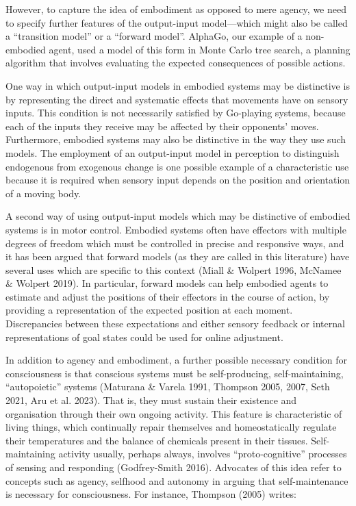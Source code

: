 \documentclass[12pt]{article}
\begin{document}
However, to capture the idea of embodiment as opposed to mere agency, we need to specify further features of the output-input model—which might also be called a ``transition model'' or a ``forward model''. AlphaGo, our example of a non-embodied agent, used a model of this form in Monte Carlo tree search, a planning algorithm that involves evaluating the expected consequences of possible actions.

One way in which output-input models in embodied systems may be distinctive is by representing the direct and systematic effects that movements have on sensory inputs. This condition is not necessarily satisfied by Go-playing systems, because each of the inputs they receive may be affected by their opponents’ moves. Furthermore, embodied systems may also be distinctive in the way they use such models. The employment of an output-input model in perception to distinguish endogenous from exogenous change is one possible example of a characteristic use because it is required when sensory input depends on the position and orientation of a moving body.

A second way of using output-input models which may be distinctive of embodied systems is in motor control. Embodied systems often have effectors with multiple degrees of freedom which must be controlled in precise and responsive ways, and it has been argued that forward models (as they are called in this literature) have several uses which are specific to this context (Miall \& Wolpert 1996, McNamee \& Wolpert 2019). In particular, forward models can help embodied agents to estimate and adjust the positions of their effectors in the course of action, by providing a representation of the expected position at each moment. Discrepancies between these expectations and either sensory feedback or internal representations of goal states could be used for online adjustment.

In addition to agency and embodiment, a further possible necessary condition for consciousness is that conscious systems must be self-producing, self-maintaining, ``autopoietic'' systems (Maturana \& Varela 1991, Thompson 2005, 2007, Seth 2021, Aru et al. 2023). That is, they must sustain their existence and organisation through their own ongoing activity. This feature is characteristic of living things, which continually repair themselves and homeostatically regulate their temperatures and the balance of chemicals present in their tissues. Self-maintaining activity usually, perhaps always, involves ``proto-cognitive'' processes of sensing and responding (Godfrey-Smith 2016). Advocates of this idea refer to concepts such as agency, selfhood and autonomy in arguing that self-maintenance is necessary for consciousness. For instance, Thompson (2005) writes:
\end{document}

